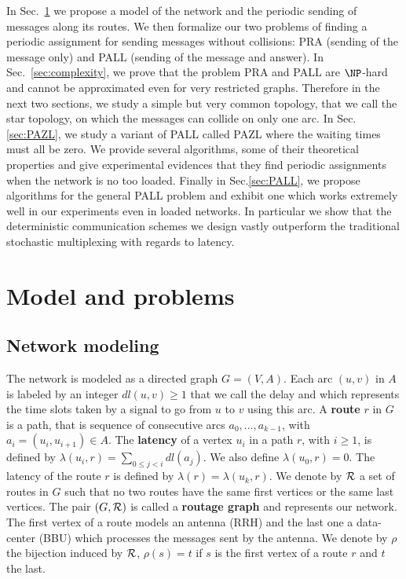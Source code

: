 \documentclass[a4paper,10pt]{article}
\begin{document}
 In Sec.~\ref{sec:def} we propose a model of the network and the periodic sending of messages along its routes. 
 We then formalize our two problems of finding a periodic assignment for sending messages without collisions: PRA (sending of the message only) and PALL (sending of the message and answer).  
In Sec.~\ref{sec:complexity}, we prove that the problem PRA and PALL are $\NP$-hard and cannot be approximated even for very
restricted graphs. 
Therefore in the next two sections, we study a simple but very common topology, that we call the
star topology, on which the messages can collide on only one arc.
In Sec.\ref{sec:PAZL}, we study a variant of PALL called PAZL  where the waiting times must all be zero. We provide several algorithms, some of their theoretical properties and give experimental evidences that they find periodic assignments when the network is no too loaded. Finally in Sec.\ref{sec:PALL}, we propose algorithms for the general PALL problem and exhibit one which works extremely well in our experiments even in loaded networks. In particular we show that the deterministic communication schemes we design vastly outperform the traditional stochastic multiplexing with regards to latency. 


\section{Model and problems}\label{sec:def}

  \subsection{Network modeling}
  

The network is modeled as a directed graph $G=(V,A)$. Each arc  $(u,v)$ in $A$ is labeled by an integer $dl(u,v) \geq 1$ that we call the delay and which represents the time slots taken by a signal to go from $u$ to $v$ using this arc. A {\bf route} $r$ in $G$ is a path, that is sequence of consecutive arcs $a_0, \ldots , a_{k-1}$, with $a_i=(u_i,u_{i+1}) \in A$.  The {\bf latency} of a vertex $u_i$ in a path $r$, with $i \geq 1$, is defined by $\lambda(u_i,r)= \sum\limits_{0 \leq j <i} dl(a_j)$. We also define $\lambda(u_0,r)=0$. The latency of the route $r$ is defined by $\lambda (r)= \lambda (u_k,r)$.
We denote by $\cal R$ a set of routes in $G$ such that no two routes have the same first vertices or the same last vertices.
The pair $(G,\cal R)$ is called a {\bf routage graph} and represents our network.
The first vertex of a route models an antenna (RRH) and the last one a data-center (BBU) which processes the messages sent by the antenna. We denote by $\rho$ the bijection induced by ${\cal R}$, $\rho(s) = t$ if $s$ is the first vertex of a route $r$ and $t$ the last. 
\end{document}
